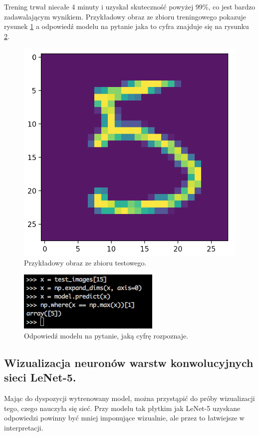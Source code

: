 Trening trwał niecałe 4 minuty i uzyskał skuteczność powyżej 99\%, co jest bardzo zadawalającym wynikiem. Przykładowy obraz ze zbioru treningowego pokazuje rysunek \ref{fig:lenet5-digit} a odpowiedź modelu na pytanie jaka to cyfra znajduje się na rysunku \ref{fig:lenet5-response}.

\begin{figure}[ht]
\centerline{\includegraphics[scale=0.5]{resources/example_digit_lenet5.png}}
\caption{Przykładowy obraz ze zbioru testowego.}
\label{fig:lenet5-digit}
\end{figure}

\begin{figure}[ht]
\centerline{\includegraphics[scale=0.5]{resources/example_digit_lenet5_response.png}}
\caption{Odpowiedź modelu na pytanie, jaką cyfrę rozpoznaje.}
\label{fig:lenet5-response}
\end{figure}

\subsection{Wizualizacja neuronów warstw konwolucyjnych sieci LeNet-5.}
Mając do dyspozycji wytrenowany model, można przystąpić do próby wizualizacji tego, czego nauczyła się sieć. Przy modelu tak płytkim jak LeNet-5 uzyskane odpowiedzi powinny być mniej imponujące wizualnie, ale przez to łatwiejsze w interpretacji.

